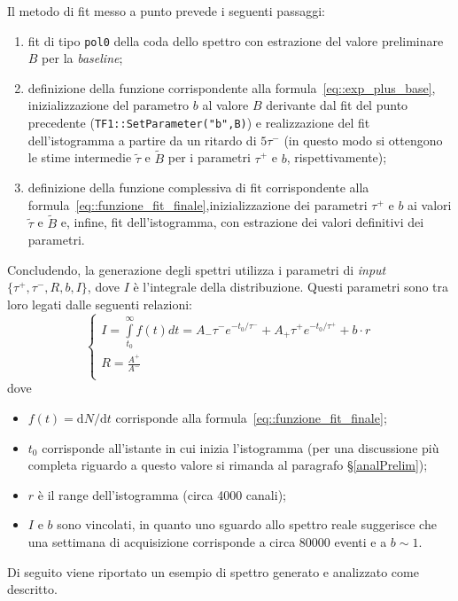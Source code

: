 \documentclass[10pt, oneside, a4paper]{article}   	%
\renewcommand{\d}{\mathrm{d}}
\begin{document}
Il metodo di fit messo a punto prevede i seguenti passaggi:
\begin{enumerate}
 \item fit di tipo \lstinline{pol0} della coda dello spettro con estrazione del valore preliminare $B$ per la \textit{baseline};
 \item definizione della funzione corrispondente alla formula~\ref{eq::exp_plus_base}, inizializzazione del parametro $b$ al valore $B$ derivante dal fit del punto precedente (\lstinline{TF1::SetParameter("b",B)}) e realizzazione del fit dell'istogramma a partire da un ritardo di $5\tau^-$ (in questo modo si ottengono le stime intermedie $\widetilde{\tau}$  e $\widetilde{B}$ per i parametri $\tau^+$ e $b$, rispettivamente);
 \item definizione della funzione complessiva di fit corrispondente alla formula~\ref{eq::funzione_fit_finale},inizializzazione dei parametri $\tau^+$ e $b$ ai valori  $\widetilde{\tau}$ e $\widetilde{B}$ e, infine, fit dell'istogramma, con estrazione dei valori definitivi dei parametri. 
%
\end{enumerate}  
Concludendo, la generazione degli spettri utilizza i parametri di \textit{input} $\{\tau^+,\tau^-,R,b,I\}$, dove $I$ è l'integrale della distribuzione. Questi parametri sono tra loro legati dalle seguenti relazioni:
\begin{equation*}
  \begin{cases}
    I = \int\limits_{t_0}^\infty f(t)dt = A_-\tau^-e^{-t_0 / \tau^-} + A_+\tau^+e^{-t_0 / \tau^+} + b\cdot r \\
    R = \frac{A^+}{A^-} \\
  \end{cases}
  \label{eq::condizioni_parametri}
\end{equation*}
dove 
\begin{itemize}
 \item $f(t) = \d N/\d t$ corrisponde alla formula~\ref{eq::funzione_fit_finale};
 \item $t_0$ corrisponde all'istante in cui inizia l'istogramma (per una discussione più completa riguardo a questo valore si rimanda al paragrafo \S\ref{analPrelim});
 \item $r$ è il range dell'istogramma (circa 4000 canali);
 \item $I$ e $b$ sono vincolati, in quanto uno sguardo allo spettro reale suggerisce che una settimana di acquisizione corrisponde a circa 80000 eventi e a $b\sim1 $.
\end{itemize}
Di seguito viene riportato un esempio di spettro generato e analizzato come descritto.
\end{document}
